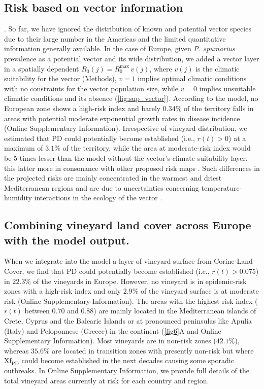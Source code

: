     \subsection{Risk based on vector information}. So far, we have ignored
    the
    distribution of known and potential vector species due to their large
    number in
    the Americas and the limited quantitative information generally available.
    In
    the case of Europe, given \textit{P. spumarius} prevalence as a potential
    vector and its wide distribution, we added	a vector layer in a spatially
    dependent $R_0(j) = R_0^{\textrm{max}}\, v(j)$, where $v(j)$ is the
    climatic
    suitability for the vector (Methods), $v=1$ implies optimal climatic
    conditions
    with no constraints for the vector population size, while $v=0$ implies
    unsuitable climatic conditions and its absence (\cref{fig:sup_vector}).
    According to the model, no European zone shows a high-risk index and barely
$0.34\%$ of the territory falls in areas with potential moderate exponential
    growth rates in disease incidence (Online Supplementary Information).
    Irrespective
    of
    vineyard
    distribution, we estimated that PD could potentially become established
    (i.e.,
$r(t) > 0$) at a maximum of $3.1\%$ of the territory, while the area at
    moderate-risk index would be $5$-times lesser than the model without the
    vector's climate suitability layer, this latter more in consonance with
    other
    proposed risk maps \cite{Godefroid2019,Bragard2019}. Such differences in
    the
    projected risks are mainly concentrated in the warmest and driest
    Mediterranean
    regions and are due to uncertainties concerning temperature-humidity
    interactions in the ecology of the vector \cite{Godefroid2021}.

    \subsection{Combining vineyard land cover across Europe with the model
        output.}
    When we integrate into the model a layer of vineyard surface from
    Corine-Land-Cover, we find that PD could potentially become established
    (i.e.,
$r(t)>0.075$) in $22.3\%$ of the vineyards in Europe. However, no vineyard is
    in epidemic-risk zones with a high-risk index and only $2.9\%$ of the
    vineyard
    surface is at moderate risk (Online Supplementary Information). The areas
    with the
    highest
    risk
    index ($r(t)$ between $0.70$ and $0.88$) are mainly located in the
    Mediterranean islands of Crete, Cyprus and the Balearic Islands or at
    pronounced peninsulas like Apulia (Italy) and Peloponnese (Greece) in the
    continent (\cref{fig6}A and Online Supplementary Information).  Most
    vineyards are
    in
    non-risk
    zones ($42.1\%$), whereas $35.6\%$ are located in transition zones with
    presently non-risk but where Xf$_{\textrm{PD}}$ could become established in
    the
    next decades causing some sporadic outbreaks. In Online Supplementary
    Information,
    we provide full details of the total vineyard areas
    currently
    at risk for each country and region.

